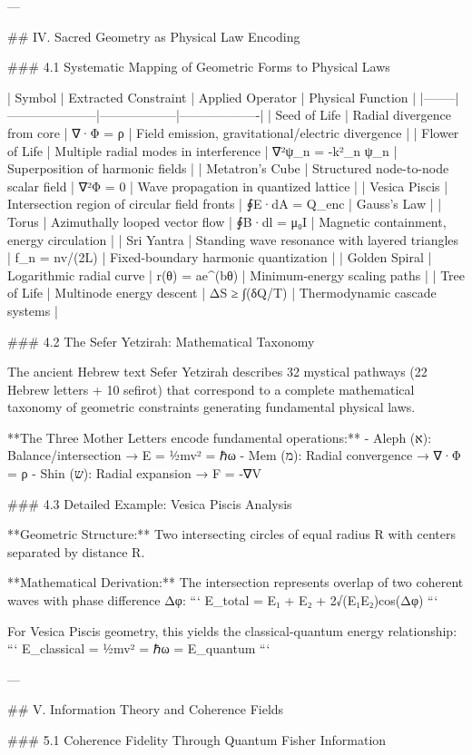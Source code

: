 ---

## IV. Sacred Geometry as Physical Law Encoding

### 4.1 Systematic Mapping of Geometric Forms to Physical Laws

| Symbol | Extracted Constraint | Applied Operator | Physical Function |
|--------|---------------------|------------------|-------------------|
| Seed of Life | Radial divergence from core | ∇·Φ = ρ | Field emission, gravitational/electric divergence |
| Flower of Life | Multiple radial modes in interference | ∇²ψ_n = -k²_n ψ_n | Superposition of harmonic fields |
| Metatron's Cube | Structured node-to-node scalar field | ∇²Φ = 0 | Wave propagation in quantized lattice |
| Vesica Piscis | Intersection region of circular field fronts | ∮E·dA = Q_enc | Gauss's Law |
| Torus | Azimuthally looped vector flow | ∮B·dl = μ₀I | Magnetic containment, energy circulation |
| Sri Yantra | Standing wave resonance with layered triangles | f_n = nv/(2L) | Fixed-boundary harmonic quantization |
| Golden Spiral | Logarithmic radial curve | r(θ) = ae^(bθ) | Minimum-energy scaling paths |
| Tree of Life | Multinode energy descent | ΔS ≥ ∫(δQ/T) | Thermodynamic cascade systems |

### 4.2 The Sefer Yetzirah: Mathematical Taxonomy

The ancient Hebrew text Sefer Yetzirah describes 32 mystical pathways (22 Hebrew letters + 10 sefirot) that correspond to a complete mathematical taxonomy of geometric constraints generating fundamental physical laws.

**The Three Mother Letters encode fundamental operations:**
- Aleph (א): Balance/intersection → E = ½mv² = ℏω
- Mem (מ): Radial convergence → ∇·Φ = ρ  
- Shin (ש): Radial expansion → F = -∇V

### 4.3 Detailed Example: Vesica Piscis Analysis

**Geometric Structure:** Two intersecting circles of equal radius R with centers separated by distance R.

**Mathematical Derivation:** The intersection represents overlap of two coherent waves with phase difference Δφ:
```
E_total = E₁ + E₂ + 2√(E₁E₂)cos(Δφ)
```

For Vesica Piscis geometry, this yields the classical-quantum energy relationship:
```
E_classical = ½mv² = ℏω = E_quantum
```

---

## V. Information Theory and Coherence Fields

### 5.1 Coherence Fidelity Through Quantum Fisher Information

